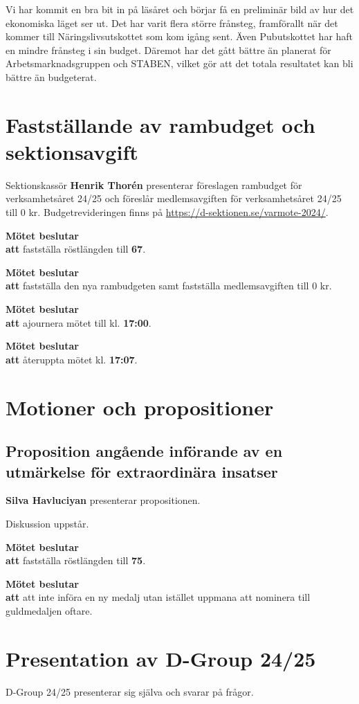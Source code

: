 \documentclass{datateknologsektionen-document}
\newcommand{\ind}{\hspace*{2em}}
\newcommand{\motetbeslutar}{\textbf{Mötet beslutar}}
\newcommand{\att}{\\\ind\textbf{att}}
\newcommand{\rostlangd}[1]{\motetbeslutar\att{} fastställa röstlängden till \textbf{#1}.}
\begin{document}
Vi har kommit en bra bit in på läsåret och börjar få en preliminär bild av hur det ekonomiska läget ser ut. Det har varit flera större frånsteg, framförallt när det kommer till Näringslivsutskottet som kom igång sent. Även Pubutskottet har haft en mindre frånsteg i sin budget. Däremot har det gått bättre än planerat för Arbetsmarknadsgruppen och STABEN, vilket gör att det totala resultatet kan bli bättre än budgeterat.

\section{Fastställande av rambudget och sektionsavgift}
Sektionskassör \textbf{Henrik Thorén} presenterar föreslagen rambudget för verksamhetsåret 24/25 och föreslår medlemsavgiften för verksamhetsåret 24/25 till 0 kr. Budgetrevideringen finns på \url{https://d-sektionen.se/varmote-2024/}.

\rostlangd{67}

\motetbeslutar\att{} fastställa den nya rambudgeten samt fastställa medlemsavgiften till 0 kr.

\motetbeslutar\att{} ajournera mötet till kl. \textbf{17:00}.

\motetbeslutar\att{} återuppta mötet kl. \textbf{17:07}.

\section{Motioner och propositioner}

\subsection{Proposition angående införande av en utmärkelse för
	extraordinära insatser}

\textbf{Silva Havluciyan} presenterar propositionen.

Diskussion uppstår.

\rostlangd{75}

\motetbeslutar\att{} att inte införa en ny medalj utan istället uppmana att nominera till guldmedaljen oftare.

\section{Presentation av D-Group 24/25}

D-Group 24/25 presenterar sig själva och svarar på frågor.
\end{document}
